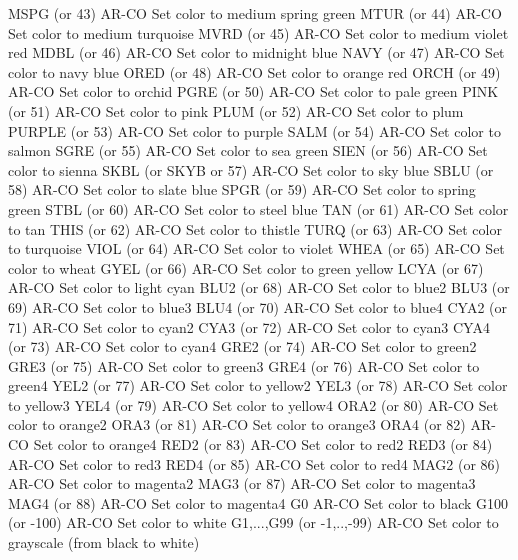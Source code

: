 MSPG    (or 43)             AR-CO Set color to medium spring green
MTUR    (or 44)             AR-CO Set color to medium turquoise
MVRD    (or 45)             AR-CO Set color to medium violet red
MDBL    (or 46)             AR-CO Set color to midnight blue
NAVY    (or 47)             AR-CO Set color to navy blue
ORED    (or 48)             AR-CO Set color to orange red
ORCH    (or 49)             AR-CO Set color to orchid
PGRE    (or 50)             AR-CO Set color to pale green
PINK    (or 51)             AR-CO Set color to pink
PLUM    (or 52)             AR-CO Set color to plum 
PURPLE  (or 53)             AR-CO Set color to purple
SALM    (or 54)             AR-CO Set color to salmon
SGRE    (or 55)             AR-CO Set color to sea green
SIEN    (or 56)             AR-CO Set color to sienna
SKBL    (or SKYB or 57)     AR-CO Set color to sky blue
SBLU    (or 58)             AR-CO Set color to slate blue
SPGR    (or 59)             AR-CO Set color to spring green
STBL    (or 60)             AR-CO Set color to steel blue
TAN     (or 61)             AR-CO Set color to tan
THIS    (or 62)             AR-CO Set color to thistle
TURQ    (or 63)             AR-CO Set color to turquoise
VIOL    (or 64)             AR-CO Set color to violet
WHEA    (or 65)             AR-CO Set color to wheat
GYEL    (or 66)             AR-CO Set color to green yellow
LCYA    (or 67)             AR-CO Set color to light cyan
BLU2    (or 68)             AR-CO Set color to blue2
BLU3    (or 69)             AR-CO Set color to blue3
BLU4    (or 70)             AR-CO Set color to blue4
CYA2    (or 71)             AR-CO Set color to cyan2
CYA3    (or 72)             AR-CO Set color to cyan3
CYA4    (or 73)             AR-CO Set color to cyan4
GRE2    (or 74)             AR-CO Set color to green2
GRE3    (or 75)             AR-CO Set color to green3
GRE4    (or 76)             AR-CO Set color to green4
YEL2    (or 77)             AR-CO Set color to yellow2
YEL3    (or 78)             AR-CO Set color to yellow3
YEL4    (or 79)             AR-CO Set color to yellow4
ORA2    (or 80)             AR-CO Set color to orange2
ORA3    (or 81)             AR-CO Set color to orange3
ORA4    (or 82)             AR-CO Set color to orange4
RED2    (or 83)             AR-CO Set color to red2
RED3    (or 84)             AR-CO Set color to red3
RED4    (or 85)             AR-CO Set color to red4
MAG2    (or 86)             AR-CO Set color to magenta2
MAG3    (or 87)             AR-CO Set color to magenta3
MAG4    (or 88)             AR-CO Set color to magenta4
G0                          AR-CO Set color to black
G100    (or -100)           AR-CO Set color to white
G1,...,G99 (or -1,..,-99)   AR-CO Set color to grayscale (from black to white)

